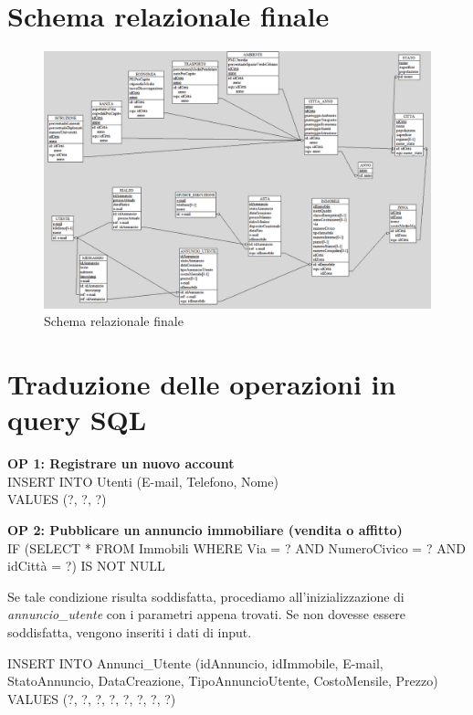 \documentclass[a4paper,12pt]{report}
\begin{document}
            \section{Schema relazionale finale}
                \begin{figure}[H]
                    \centering{}
                    \includegraphics[width=\linewidth]{./images/relational_scheme.png}
                    \caption{Schema relazionale finale}
            \end{figure}
                
            \section{Traduzione delle operazioni in query SQL}

            \textbf{OP 1: Registrare un nuovo account} \\
            INSERT INTO Utenti (E-mail, Telefono, Nome) \\
            VALUES (?, ?, ?)
            
            \textbf{OP 2: Pubblicare un annuncio immobiliare (vendita o affitto)} \\
            IF (SELECT *
                FROM Immobili
                WHERE Via = ? AND NumeroCivico = ? AND idCittà = ?) IS NOT NULL
            
            Se tale condizione risulta soddisfatta, procediamo all'inizializzazione di \textit{annuncio\_utente} con i
            parametri appena trovati. Se non dovesse essere soddisfatta, vengono inseriti i dati di input.

            INSERT INTO Annunci\_Utente (idAnnuncio, idImmobile, E-mail, StatoAnnuncio, DataCreazione, TipoAnnuncioUtente, CostoMensile, Prezzo)
            VALUES (?, ?, ?, ?, ?, ?, ?, ?)
\end{document}
